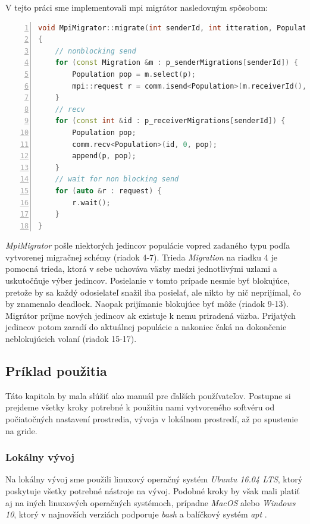 V tejto práci sme implementovali \acrshort{mpi} migrátor nasledovným spôsobom:
\begin{lstlisting}[language=c++, caption={Kód MpiMigrator-a}, numbers={left}, label={lst:mpi-mig}]
void MpiMigrator::migrate(int senderId, int itteration, Population &population)
{
    // nonblocking send
    for (const Migration &m : p_senderMigrations[senderId]) {
        Population pop = m.select(p);
        mpi::request r = comm.isend<Population>(m.receiverId(), 0, pop);
    }
    // recv
    for (const int &id : p_receiverMigrations[senderId]) {
        Population pop;
        comm.recv<Population>(id, 0, pop);
        append(p, pop);
    }
    // wait for non blocking send
    for (auto &r : request) {
        r.wait();
    }
}
\end{lstlisting}
\textit{MpiMigrator} pošle niektorých jedincov populácie vopred zadaného typu podľa vytvorenej migračnej schémy (riadok 4-7).
Trieda \textit{Migration} na riadku 4 je pomocná trieda, ktorá v sebe uchováva väzby medzi jednotlivými uzlami a uskutočňuje výber jedincov.
Posielanie v tomto prípade nesmie byť blokujúce, pretože by sa každý odosielateľ snažil iba posielať, ale nikto by nič neprijímal, čo by znamenalo deadlock.
Naopak prijímanie blokujúce byť môže (riadok 9-13). Migrátor príjme nových jedincov ak existuje k nemu priradená väzba.
Prijatých jedincov potom zaradí do aktuálnej populácie a nakoniec čaká na dokončenie neblokujúcich volaní (riadok 15-17).

\subsection{Príklad použitia}
Táto kapitola by mala slúžiť ako manuál pre ďalších používateľov.
Postupne si prejdeme všetky kroky potrebné k použitiu nami vytvoreného softvéru od počiatočných nastavení prostredia,
vývoja v lokálnom prostredí, až po spustenie na gride.

\subsubsection{Lokálny vývoj}
\label{subsec:local-dev}
Na lokálny vývoj sme použili linuxový operačný systém \textit{Ubuntu 16.04 LTS}, ktorý poskytuje všetky potrebné nástroje na vývoj.
Podobné kroky by však mali platiť aj na iných linuxových operačných systémoch, prípadne \textit{MacOS} alebo \textit{Windows 10},
ktorý v najnovších verziách podporuje \textit{bash} a balíčkový systém \textit{apt} \cite{bash-on-win}.

